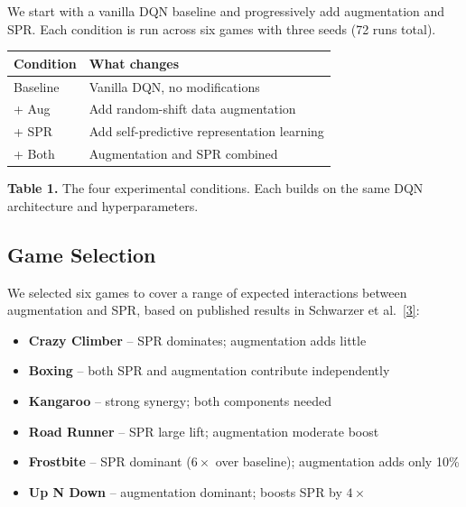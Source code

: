 \documentclass[11pt]{article}
\newcommand{\citelink}[2]{\href{#1}{\small[#2]}}
\begin{document}
We start with a vanilla DQN baseline and progressively add augmentation
and SPR. Each condition is run across six games with three seeds
(72 runs total).

\begin{table}[h]
\centering
\renewcommand{\arraystretch}{1.3}
\setlength{\tabcolsep}{12pt}
\begin{tabular}{l l}
\toprule
\textbf{Condition} & \textbf{What changes} \\
\midrule
Baseline  & Vanilla DQN, no modifications \\
+ Aug     & Add random-shift data augmentation \\
+ SPR     & Add self-predictive representation learning \\
+ Both    & Augmentation and SPR combined \\
\bottomrule
\end{tabular}

\vspace{1.2em}
{\raggedright\small \textbf{Table 1.} The four experimental conditions.
Each builds on the same DQN architecture and hyperparameters.\par}
\end{table}

\subsection{Game Selection}

We selected six games to cover a range of expected interactions between
augmentation and SPR, based on published results in Schwarzer et al.\
\citelink{https://arxiv.org/abs/2007.05929}{3}:

\begin{itemize}[itemsep=2pt]
  \item \textbf{Crazy Climber} -- SPR dominates; augmentation adds little
  \item \textbf{Boxing} -- both SPR and augmentation contribute
    independently
  \item \textbf{Kangaroo} -- strong synergy; both components needed
  \item \textbf{Road Runner} -- SPR large lift; augmentation moderate
    boost
  \item \textbf{Frostbite} -- SPR dominant ($6\times$ over baseline);
    augmentation adds only 10\%
  \item \textbf{Up N Down} -- augmentation dominant; boosts SPR by
    $4\times$
\end{itemize}
\end{document}
